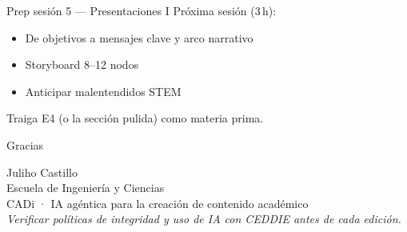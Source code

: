 \documentclass[aspectratio=169,11pt]{beamer}
\begin{document}
\begin{frame}{Prep sesión 5 --- Presentaciones I}
Próxima sesión (3\,h):
\begin{itemize}
\item De objetivos a mensajes clave y arco narrativo
\item Storyboard 8--12 nodos
\item Anticipar malentendidos STEM
\end{itemize}
Traiga E4 (o la sección pulida) como materia prima.
\end{frame}

\begin{frame}{Gracias}
\begin{center}
{\Large Juliho Castillo}\\[0.5em]
Escuela de Ingeniería y Ciencias\\[1em]
CADi · IA agéntica para la creación de contenido académico\\[1.5em]
{\small \emph{Verificar políticas de integridad y uso de IA con CEDDIE antes de cada edición.}}
\end{center}
\end{frame}
\end{document}
